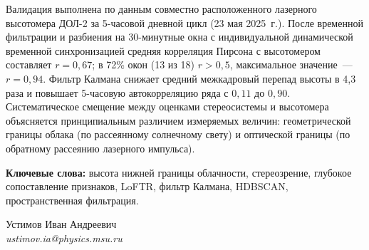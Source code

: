 \documentclass[11pt]{article}
\begin{document}
\begin{titlepage}
Валидация выполнена по данным совместно расположенного лазерного высотомера ДОЛ-2 за 5-часовой дневной цикл (23 мая 2025~г.). После временной фильтрации и разбиения на 30-минутные окна с индивидуальной динамической временной синхронизацией средняя корреляция Пирсона с высотомером составляет $r = 0{,}67$; в 72\% окон (13 из 18) $r > 0{,}5$, максимальное значение~--- $r = 0{,}94$. Фильтр Калмана снижает средний межкадровый перепад высоты в 4{,}3 раза и повышает 5-часовую автокорреляцию ряда с $0{,}11$ до $0{,}90$. Систематическое смещение между оценками стереосистемы и высотомера объясняется принципиальным различием измеряемых величин: геометрической границы облака (по рассеянному солнечному свету) и оптической границы (по обратному рассеянию лазерного импульса).

\vspace{10mm}

\noindent\textbf{Ключевые слова:} высота нижней границы облачности, стереозрение, глубокое сопоставление признаков, LoFTR, фильтр Калмана, HDBSCAN, пространственная фильтрация.

\vspace{10mm}

\begin{flushright}
\normalsize
Устимов Иван Андреевич\\
\textit{ustimov.ia@physics.msu.ru}
\end{flushright}

\end{titlepage}
\end{document}
